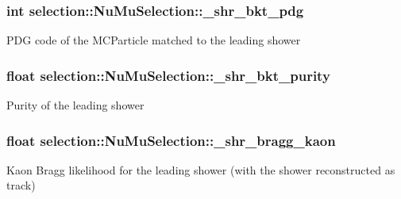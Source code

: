 \subsubsection[{\texorpdfstring{\+\_\+shr\+\_\+bkt\+\_\+pdg}{_shr_bkt_pdg}}]{\setlength{\rightskip}{0pt plus 5cm}int selection\+::\+Nu\+Mu\+Selection\+::\+\_\+shr\+\_\+bkt\+\_\+pdg\hspace{0.3cm}{\ttfamily [private]}}\hypertarget{classselection_1_1NuMuSelection_ab5695d0d13afa6fe27e38b63951ade58}{}\label{classselection_1_1NuMuSelection_ab5695d0d13afa6fe27e38b63951ade58}
P\+DG code of the M\+C\+Particle matched to the leading shower 
\subsubsection[{\texorpdfstring{\+\_\+shr\+\_\+bkt\+\_\+purity}{_shr_bkt_purity}}]{\setlength{\rightskip}{0pt plus 5cm}float selection\+::\+Nu\+Mu\+Selection\+::\+\_\+shr\+\_\+bkt\+\_\+purity\hspace{0.3cm}{\ttfamily [private]}}\hypertarget{classselection_1_1NuMuSelection_a6988cb9e869c0205f44659b3a65bd047}{}\label{classselection_1_1NuMuSelection_a6988cb9e869c0205f44659b3a65bd047}
Purity of the leading shower 
\subsubsection[{\texorpdfstring{\+\_\+shr\+\_\+bragg\+\_\+kaon}{_shr_bragg_kaon}}]{\setlength{\rightskip}{0pt plus 5cm}float selection\+::\+Nu\+Mu\+Selection\+::\+\_\+shr\+\_\+bragg\+\_\+kaon\hspace{0.3cm}{\ttfamily [private]}}\hypertarget{classselection_1_1NuMuSelection_a32142048875e97db40e44f0b4a51eae3}{}\label{classselection_1_1NuMuSelection_a32142048875e97db40e44f0b4a51eae3}
Kaon Bragg likelihood for the leading shower (with the shower reconstructed as track) 
